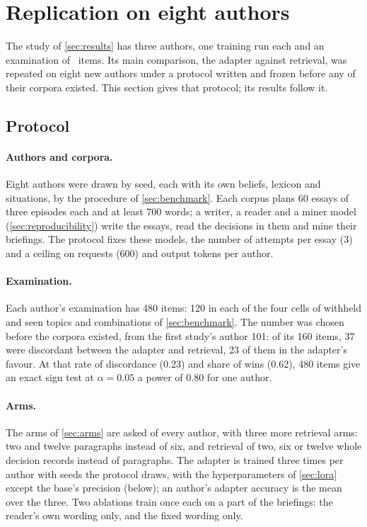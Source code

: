 
\section{Replication on eight authors}\label{sec:replication}

The study of \cref{sec:results} has three authors, one training run each and an examination
of \ExamItems\ items. Its main comparison, the adapter against retrieval, was repeated on
eight new authors under a protocol written and frozen before any of their corpora existed.
This section gives that protocol; its results follow it.

\subsection{Protocol}\label{sec:protocol}

\paragraph{Authors and corpora.} Eight authors were drawn by seed, each with its own beliefs,
lexicon and situations, by the procedure of \cref{sec:benchmark}. Each corpus plans 60 essays
of three episodes each and at least 700 words; a writer, a reader and a miner model
(\cref{sec:reproducibility}) write the essays, read the decisions in them and mine their
briefings. The protocol fixes these models, the number of
attempts per essay (3) and a ceiling on requests (600) and output tokens per author.

\paragraph{Examination.} Each author's examination has 480 items: 120 in each of the four
cells of withheld and seen topics and combinations of \cref{sec:benchmark}. The number was
chosen before the corpora existed, from the first study's author 101: of its 160 items, 37
were discordant between the adapter and retrieval, 23 of them in the adapter's favour. At that
rate of discordance (0.23) and share of wins (0.62), 480 items give an exact sign test at
$\alpha = 0.05$ a power of 0.80 for one author.

\paragraph{Arms.} The arms of \cref{sec:arms} are asked of every author, with three more
retrieval arms: two and twelve paragraphs instead of six, and retrieval of two, six or twelve
whole decision records instead of paragraphs. The adapter is trained three times per author
with seeds the protocol draws, with the hyperparameters of \cref{sec:lora} except the base's precision (below); an author's
adapter accuracy is the mean over the three. Two ablations train once each on a part of the
briefings: the reader's own wording only, and the fixed wording only.

